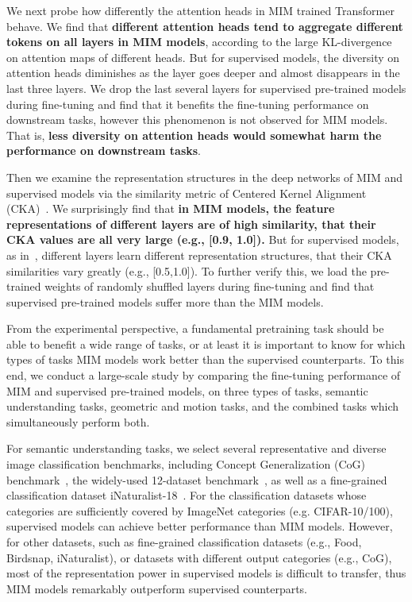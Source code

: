 \documentclass{article}
\begin{document}
We next probe how differently the attention heads in MIM trained Transformer behave. We find that \textbf{different attention heads tend to aggregate different tokens on all layers in MIM models}, according to the large KL-divergence on attention maps of different heads.
But for supervised models, the diversity on attention heads diminishes as the layer goes deeper and almost disappears in the last three layers. We drop the last several layers for supervised pre-trained models during fine-tuning and find that it benefits the fine-tuning performance on downstream tasks, however this phenomenon is not observed for MIM models. That is, \textbf{less diversity on attention heads would somewhat harm the performance on downstream tasks}. 

Then we examine the representation structures in the deep networks of MIM and supervised models via the similarity metric of Centered Kernel Alignment (CKA)~\cite{cka}. We surprisingly find that \textbf{in MIM models, the feature representations of different layers are of high similarity, that their CKA values are all very large (e.g., [0.9, 1.0]).} But for supervised models, as in~\cite{raghu2021vision}, different layers learn different representation structures, that their CKA similarities vary greatly (e.g., [0.5,1.0]). To further verify this, we load the pre-trained weights of randomly shuffled layers during fine-tuning and find that supervised pre-trained models suffer more than the MIM models.



From the experimental perspective, a fundamental pretraining task should be able to benefit a wide range of tasks, or at least it is important to know for which types of tasks MIM models work better than the supervised counterparts. To this end, we conduct a large-scale study by comparing the fine-tuning performance of MIM and supervised pre-trained models, on three types of tasks, semantic understanding tasks, geometric and motion tasks, and the combined tasks which simultaneously perform both.



For semantic understanding tasks, we select several representative and diverse image classification benchmarks, including Concept Generalization (CoG) benchmark~\cite{sariyildiz2021cog}, the widely-used 12-dataset benchmark~\cite{kornblith2019better}, as well as a fine-grained classification dataset iNaturalist-18~\cite{van2018inaturalist}. 
For the classification datasets whose categories are sufficiently covered by ImageNet categories (e.g. CIFAR-10/100), supervised models can achieve better performance than MIM models. However, for other datasets, such as fine-grained classification datasets (e.g., Food, Birdsnap, iNaturalist), or datasets with different output categories (e.g., CoG), most of the representation power in supervised models is difficult to transfer, thus MIM models remarkably outperform supervised counterparts.
\end{document}
